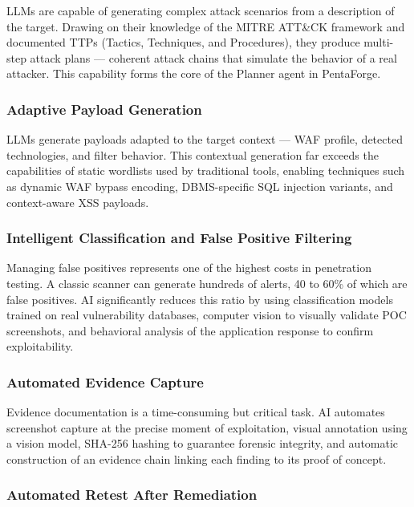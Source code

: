 \documentclass[12pt,a4paper]{report}
\begin{document}
LLMs are capable of generating complex attack scenarios from a description of the
target. Drawing on their knowledge of the MITRE ATT\&CK framework and documented
TTPs (Tactics, Techniques, and Procedures), they produce multi-step attack plans
--- coherent attack chains that simulate the behavior of a real attacker. This
capability forms the core of the Planner agent in PentaForge.

\subsubsection{Adaptive Payload Generation}

LLMs generate payloads adapted to the target context --- WAF profile, detected
technologies, and filter behavior. This contextual generation far exceeds the
capabilities of static wordlists used by traditional tools, enabling techniques
such as dynamic WAF bypass encoding, DBMS-specific SQL injection variants, and
context-aware XSS payloads.

\subsubsection{Intelligent Classification and False Positive Filtering}

Managing false positives represents one of the highest costs in penetration testing.
A classic scanner can generate hundreds of alerts, 40 to 60\% of which are false
positives. AI significantly reduces this ratio by using classification models
trained on real vulnerability databases, computer vision to visually validate POC
screenshots, and behavioral analysis of the application response to confirm
exploitability.

\subsubsection{Automated Evidence Capture}

Evidence documentation is a time-consuming but critical task. AI automates
screenshot capture at the precise moment of exploitation, visual annotation using
a vision model, SHA-256 hashing to guarantee forensic integrity, and automatic
construction of an evidence chain linking each finding to its proof of concept.

\subsubsection{Automated Retest After Remediation}
\end{document}
